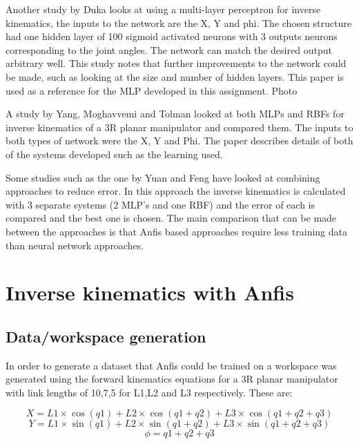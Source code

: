 \documentclass[a4paper,11pt]{article}
\begin{document}
Another study by Duka  \cite{mlp1}  looks at using a multi-layer perceptron for inverse kinematics, the inputs to the network are the X, Y and phi. The chosen structure had one hidden layer of 100 sigmoid activated neurons with 3 outputs neurons corresponding to the joint angles. The network can match the desired output arbitrary well. This study notes that further improvements to the network could be made, such as looking at the size and number of hidden layers. This paper is used as a reference for the MLP developed in this assignment. Photo

A study by Yang, Moghavvemi and Tolman\cite{mlprbf} looked at both MLPs and RBFs for inverse kinematics of a 3R planar manipulator and compared them. The inputs to both types of network were the X, Y and Phi. The paper describes details of both of the systems developed such as the learning used.

Some studies such as the one by Yuan and Feng \cite{mixed1} have looked at combining approaches to reduce error. In this approach the inverse kinematics is calculated with 3 separate systems (2 MLP’s and one RBF) and the error of each is compared and the best one is chosen.%
The main comparison that can be made between the approaches is that Anfis based approaches require less training data than neural network approaches.%







\section{Inverse kinematics with Anfis}
\subsection{Data/workspace generation}
In order to generate a dataset that Anfis could be trained on a workspace was generated using the forward kinematics equations for a 3R planar manipulator with link lengths of 10,7,5 for L1,L2 and L3 respectively. These are:


\[ X = L1 \times  \cos(q1)+ L2 \times \cos(q1 + q2) + L3 \times  \cos(q1 + q2 + q3) \]
\[ Y = L1 \times  \sin(q1)+ L2 \times  \sin(q1 + q2) + L3 \times  \sin(q1 + q2 + q3) \]
\[ \phi = q1 + q2 + q3\]
\end{document}
